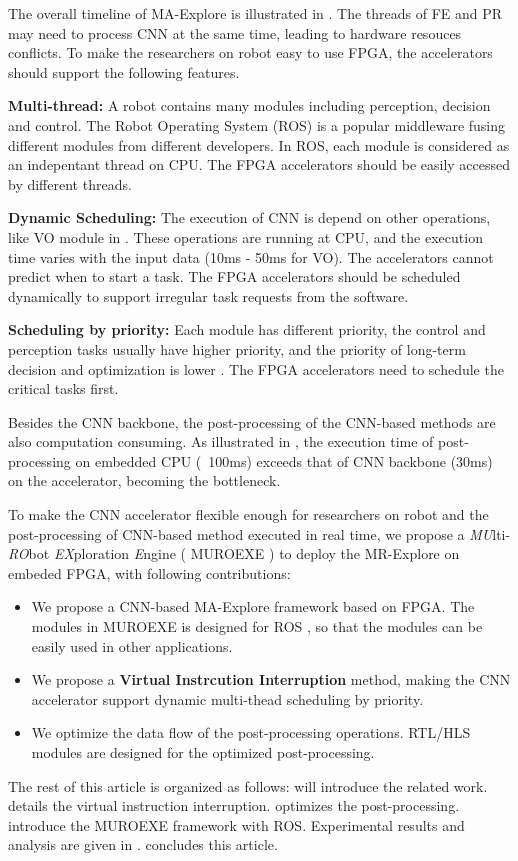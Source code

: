 The overall timeline of MA-Explore is illustrated in . The threads of FE and PR may need to process CNN at the same time, leading to hardware resouces conflicts. To make the researchers on robot easy to use FPGA, the accelerators should support the following features.

\textbf{Multi-thread:} A robot contains many modules including perception, decision and control. The Robot Operating System (ROS) \cite{quigley2009ros} is a popular middleware fusing different modules from different developers. In ROS, each module is considered as an indepentant thread on CPU. The FPGA accelerators should be easily accessed by different threads.

\textbf{Dynamic Scheduling:} The execution of CNN is depend on other operations, like VO module in . These operations are running at CPU, and the execution time varies with the input data (10ms - 50ms for VO). The accelerators cannot predict when to start a task. The FPGA accelerators should be scheduled dynamically to support irregular task requests from the software.

\textbf{Scheduling by priority:} Each module has different priority, the control and perception tasks usually have higher priority, and the priority of long-term decision and optimization is lower \cite{RamsauerKLM17}. The FPGA accelerators need to schedule the critical tasks first.

Besides the CNN backbone, the post-processing of the CNN-based methods are also computation consuming. As illustrated in , the execution time of post-processing on embedded CPU (~100ms) exceeds that of CNN backbone (30ms) on the accelerator, becoming the bottleneck.


To make the CNN accelerator flexible enough for researchers on robot and the post-processing of CNN-based method executed in real time, we propose a \textit{MU}lti-\textit{RO}bot \textit{EX}ploration \textit{E}ngine ( MUROEXE ) to deploy the MR-Explore on embeded FPGA, with following contributions:

\begin{itemize}
    \item We propose a CNN-based MA-Explore framework based on FPGA. The modules in MUROEXE is designed for ROS \cite{quigley2009ros}, so that the modules can be easily used in other applications.
    \item We propose a \textbf{Virtual Instrcution Interruption} method, making the CNN accelerator support dynamic multi-thead scheduling by priority.
    \item We optimize the data flow of the post-processing operations. RTL/HLS modules are designed for the optimized post-processing.
\end{itemize}

The rest of this article is organized as follows:  will introduce the related work.  details the virtual instruction interruption.  optimizes the post-processing.  introduce the MUROEXE framework with ROS. Experimental results and analysis are given in .  concludes this article.